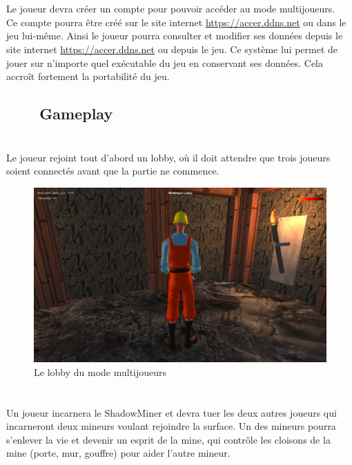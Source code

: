 \documentclass[titlepage, 13px, a4paper]{report}
\begin{document}
\paragraph*{} \hspace{0pt} \\
Le joueur devra créer un compte pour pouvoir accéder au mode multijoueurs. \\
Ce compte pourra être créé sur le site internet \url{https://accer.ddns.net} ou dans le jeu lui-même. Ainsi le joueur pourra 
consulter et modifier ses données depuis le site internet \url{https://accer.ddns.net} ou depuis le jeu. Ce système lui permet 
de jouer sur n’importe quel exécutable du jeu en conservant ses données. 
Cela accroît fortement la portabilité du jeu. \\

\subsection[Gameplay]{~~~~Gameplay}
\paragraph*{} \hspace{0pt} \\
Le joueur rejoint tout d’abord un lobby, où il doit attendre que trois joueurs 
soient connectés avant que la partie ne commence.

\begin{figure}[h!]
  \centering
  \includegraphics[scale=0.3]{images/multi_lobby.png}
  \caption{Le lobby du mode multijoueurs}
\end{figure}

\paragraph*{} \hspace{0pt} \\
Un joueur incarnera le ShadowMiner et devra tuer les deux autres joueurs qui 
incarneront deux mineurs voulant rejoindre la surface. Un des mineurs pourra 
s’enlever la vie et devenir un esprit de la mine, qui contrôle les cloisons de 
la mine (porte, mur, gouffre) pour aider l’autre mineur. \\
\end{document}
